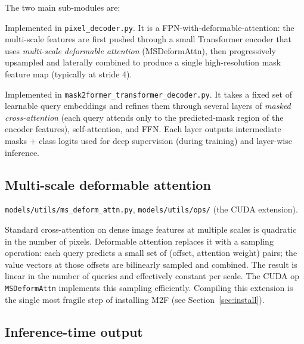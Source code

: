 \documentclass[11pt,a4paper]{article}
\begin{document}
The two main sub-modules are:
\begin{description}[leftmargin=1.6em,style=nextline]
  \item[Pixel decoder.] Implemented in \texttt{pixel\_decoder.py}. It is a
        FPN-with-deformable-attention: the multi-scale features are first
        pushed through a small Transformer encoder that uses
        \emph{multi-scale deformable attention} (MSDeformAttn), then
        progressively upsampled and laterally combined to produce a
        single high-resolution mask feature map (typically at stride 4).
  \item[Transformer decoder.] Implemented in
        \texttt{mask2former\_transformer\_decoder.py}. It takes a fixed
        set of learnable query embeddings and refines them through several
        layers of \emph{masked cross-attention} (each query attends only
        to the predicted-mask region of the encoder features),
        self-attention, and FFN. Each layer outputs intermediate masks +
        class logits used for deep supervision (during training) and
        layer-wise inference.
\end{description}

\subsection{Multi-scale deformable attention}

\begin{srcbox}
\texttt{models/utils/ms\_deform\_attn.py},
\texttt{models/utils/ops/} (the CUDA extension).
\end{srcbox}

Standard cross-attention on dense image features at multiple scales is
quadratic in the number of pixels. Deformable attention replaces it with a
sampling operation: each query predicts a small set of (offset, attention
weight) pairs; the value vectors at those offsets are bilinearly sampled
and combined. The result is linear in the number of queries and effectively
constant per scale. The CUDA op \texttt{MSDeformAttn} implements this
sampling efficiently. Compiling this extension is the single most fragile
step of installing M2F (see Section~\ref{sec:install}).

\subsection{Inference-time output}
\end{document}
